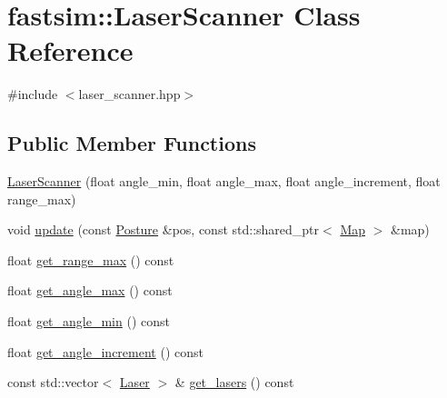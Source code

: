 \hypertarget{classfastsim_1_1_laser_scanner}{}\section{fastsim\+:\+:Laser\+Scanner Class Reference}
\label{classfastsim_1_1_laser_scanner}


{\ttfamily \#include $<$laser\+\_\+scanner.\+hpp$>$}

\subsection*{Public Member Functions}
\begin{DoxyCompactItemize}
\item 
\hyperlink{classfastsim_1_1_laser_scanner_a9840895606ec9c33515e9bf3c05e178f}{Laser\+Scanner} (float angle\+\_\+min, float angle\+\_\+max, float angle\+\_\+increment, float range\+\_\+max)
\item 
void \hyperlink{classfastsim_1_1_laser_scanner_a60d55db74413e1d41fb93c69ab462f54}{update} (const \hyperlink{classfastsim_1_1_posture}{Posture} \&pos, const std\+::shared\+\_\+ptr$<$ \hyperlink{classfastsim_1_1_map}{Map} $>$ \&map)
\item 
float \hyperlink{classfastsim_1_1_laser_scanner_a6bee57460168ca1dcc490b09e3e7eb13}{get\+\_\+range\+\_\+max} () const 
\item 
float \hyperlink{classfastsim_1_1_laser_scanner_a013336c6e9eb6800846c8049c06ea9b8}{get\+\_\+angle\+\_\+max} () const 
\item 
float \hyperlink{classfastsim_1_1_laser_scanner_a46347fc672114082f7acc2aa5ff2638b}{get\+\_\+angle\+\_\+min} () const 
\item 
float \hyperlink{classfastsim_1_1_laser_scanner_a6f1ccb5d08f00beaab1cb420fbada627}{get\+\_\+angle\+\_\+increment} () const 
\item 
const std\+::vector$<$ \hyperlink{classfastsim_1_1_laser}{Laser} $>$ \& \hyperlink{classfastsim_1_1_laser_scanner_af91cd6149896f3c3c8351a4f4eda716a}{get\+\_\+lasers} () const 
\end{DoxyCompactItemize}
